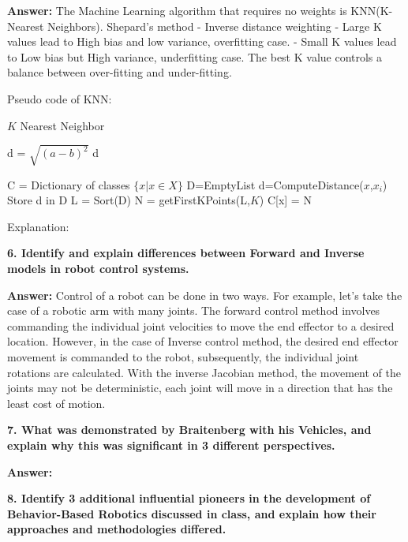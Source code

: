 \documentclass[a4paper, 10pt]{article}
\begin{document}
\textbf{Answer:} The Machine Learning algorithm that requires no weights is KNN(K- Nearest Neighbors).  
Shepard’s method - Inverse distance weighting
 - Large K values lead to High bias and low variance, overfitting case.
 - Small K values lead to Low bias but High variance, underfitting case.
 The best K value controls a balance between over-fitting and under-fitting.

Pseudo code of KNN:
\begin{algorithm}

	\caption{$K$ Nearest Neighbor}
	\begin{algorithmic}[1]
			\State d = $\sqrt{(a-b)^{2}}$
			\State \Return d
		\EndFunction
		
		\State C = Dictionary of classes
			\State $\{x|x \in X\}$ 
			\State D=EmptyList
				\State d=ComputeDistance($x$,$x_{i}$)
				\State Store d in D
			\EndFor
			\State L = Sort(D)
			\State N = getFirstKPoints(L,$K$)
			\State C[x] = N 
			
		\EndFor
	\end{algorithmic}
\end{algorithm}


Explanation:

\hfill

\textbf{6. Identify and explain differences between Forward and Inverse models in robot control systems.}

\textbf{Answer:} Control of a robot can be done in two ways. For example, let's take the case of a robotic arm with many joints. The forward control method involves commanding the individual joint velocities to move the end effector to a desired location. 
However, in the case of Inverse control method, the desired end effector movement is commanded to the robot, subsequently, the individual joint rotations are calculated. With the inverse Jacobian method, the movement of the joints may not be deterministic, each joint will move in a direction that has the least cost of motion. 

\hfill

\textbf{7. What was demonstrated by Braitenberg with his Vehicles, and explain why this was significant in 3 different  perspectives.}

\textbf{Answer:} 

\hfill

\textbf{8. Identify 3 additional influential pioneers in the development of Behavior-Based Robotics discussed in class, and explain how their approaches and methodologies differed.}
\end{document}

